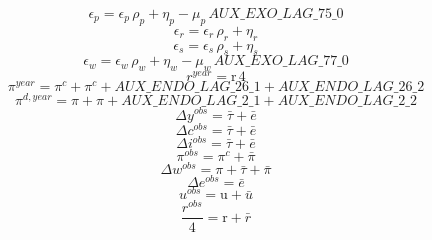 \begin{dmath}
{{\epsilon_{p}}}={{\epsilon_{p}}}\, {{\rho_{p}}}+{{\eta_{p}}}-{{\mu_{p}}}\, {AUX\_EXO\_LAG\_75\_0}
\end{dmath}
\begin{dmath}
{{\epsilon_{r}}}={{\epsilon_{r}}}\, {{\rho_{r}}}+{{\eta_{r}}}
\end{dmath}
\begin{dmath}
{{\epsilon_{s}}}={{\epsilon_{s}}}\, {{\rho_{s}}}+{{\eta_{s}}}
\end{dmath}
\begin{dmath}
{{\epsilon_{w}}}={{\epsilon_{w}}}\, {{\rho_{w}}}+{{\eta_{w}}}-{{\mu_{w}}}\, {AUX\_EXO\_LAG\_77\_0}
\end{dmath}
\begin{dmath}
{{r^{year}}}={{\mathrm{r}}}\, 4
\end{dmath}
\begin{dmath}
{{\pi^{year}}}={{\pi^{c}}}+{{\pi^{c}}}+{AUX\_ENDO\_LAG\_26\_1}+{AUX\_ENDO\_LAG\_26\_2}
\end{dmath}
\begin{dmath}
{{\pi^{d,year}}}={{\pi}}+{{\pi}}+{AUX\_ENDO\_LAG\_2\_1}+{AUX\_ENDO\_LAG\_2\_2}
\end{dmath}
\begin{dmath}
{{\Delta y^{obs}}}={{\bar{\tau}}}+{{\bar{e}}}
\end{dmath}
\begin{dmath}
{{\Delta c^{obs}}}={{\bar{\tau}}}+{{\bar{e}}}
\end{dmath}
\begin{dmath}
{{\Delta i^{obs}}}={{\bar{\tau}}}+{{\bar{e}}}
\end{dmath}
\begin{dmath}
{{\pi^{obs}}}={{\pi^{c}}}+{{\bar{\pi}}}
\end{dmath}
\begin{dmath}
{{\Delta w^{obs}}}={{\pi}}+{{\bar{\tau}}}+{{\bar{\pi}}}
\end{dmath}
\begin{dmath}
{{\Delta e^{obs}}}={{\bar{e}}}
\end{dmath}
\begin{dmath}
{{u^{obs}}}={{\mathrm{u}}}+{{\bar{u}}}
\end{dmath}
\begin{dmath}
\frac{{{r^{obs}}}}{4}={{\mathrm{r}}}+{{\bar{r}}}
\end{dmath}
